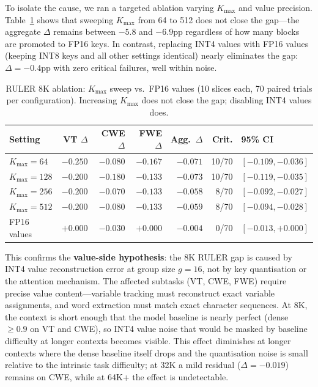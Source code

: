 \documentclass[11pt,a4paper]{article}
\theoremstyle{definition}
\theoremstyle{remark}
\begin{document}
To isolate the cause, we ran a targeted ablation varying $K_{\max}$ and value precision.  Table~\ref{tab:ruler_8k_ablation} shows that sweeping $K_{\max}$ from 64 to 512 does not close the gap---the aggregate $\Delta$ remains between $-5.8$ and $-6.9$pp regardless of how many blocks are promoted to FP16 keys.  In contrast, replacing INT4 values with FP16 values (keeping INT8 keys and all other settings identical) nearly eliminates the gap: $\Delta{=}{-}0.4$pp with zero critical failures, well within noise.

\begin{table}[H]
\centering
\caption{RULER 8K ablation: $K_{\max}$ sweep vs.\ FP16 values (10 slices each, 70 paired trials per configuration).  Increasing $K_{\max}$ does not close the gap; disabling INT4 values does.}
\label{tab:ruler_8k_ablation}
\small
\begin{tabular}{lrrrrrl}
\toprule
\textbf{Setting} & \textbf{VT $\Delta$} & \textbf{CWE $\Delta$} & \textbf{FWE $\Delta$} & \textbf{Agg.\ $\Delta$} & \textbf{Crit.} & \textbf{95\% CI} \\
\midrule
$K_{\max}{=}64$   & $-0.250$ & $-0.080$ & $-0.167$ & $-0.071$ & 10/70 & $[-0.109, -0.036]$ \\
$K_{\max}{=}128$  & $-0.200$ & $-0.180$ & $-0.133$ & $-0.073$ & 10/70 & $[-0.119, -0.035]$ \\
$K_{\max}{=}256$  & $-0.200$ & $-0.070$ & $-0.133$ & $-0.058$ & 8/70  & $[-0.092, -0.027]$ \\
$K_{\max}{=}512$  & $-0.200$ & $-0.080$ & $-0.133$ & $-0.059$ & 8/70  & $[-0.094, -0.028]$ \\
\midrule
FP16 values       & $+0.000$ & $-0.030$ & $+0.000$ & $-0.004$ & 0/70  & $[-0.013, +0.000]$ \\
\bottomrule
\end{tabular}
\end{table}

This confirms the \textbf{value-side hypothesis}: the 8K RULER gap is caused by INT4 value reconstruction error at group size $g{=}16$, not by key quantisation or the attention mechanism.  The affected subtasks (VT, CWE, FWE) require precise value content---variable tracking must reconstruct exact variable assignments, and word extraction must match exact character sequences.  At 8K, the context is short enough that the model baseline is nearly perfect (dense ${\geq}0.9$ on VT and CWE), so INT4 value noise that would be masked by baseline difficulty at longer contexts becomes visible.  This effect diminishes at longer contexts where the dense baseline itself drops and the quantisation noise is small relative to the intrinsic task difficulty; at 32K a mild residual ($\Delta{=}{-}0.019$) remains on CWE, while at 64K+ the effect is undetectable.
\end{document}
